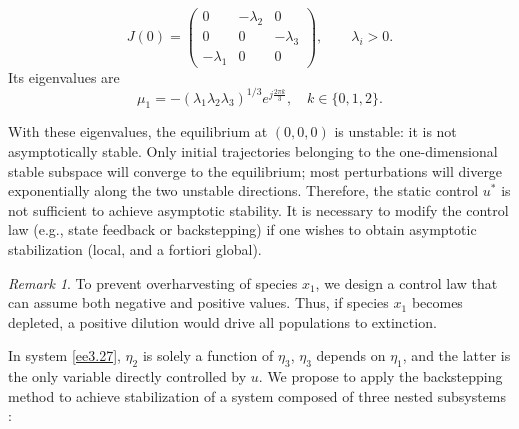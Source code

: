 \documentclass[10pt, a4paper]{amsart}
\newcounter{assu}
\theoremstyle{plain}
\theoremstyle{definition}
\theoremstyle{remark}
\newtheorem{remark}[lemma]{Remark}
\numberwithin{equation}{section}
\begin{document}
 $$
 J(0) =
 \begin{pmatrix}
 0 & -\lambda_2 & 0 \\[6pt]
 0 & 0 & -\lambda_3 \\[6pt]
 -\lambda_1 & 0 & 0
 \end{pmatrix},
 \qquad \lambda_i > 0.
 $$
Its eigenvalues are
$$\mu_1 = -(\lambda_1\lambda_2\lambda_3)^{1/3}e^{j\frac{2\pi k}{3}},\quad k\in \lbrace0,1,2\rbrace.$$

With these eigenvalues, the equilibrium at $(0,0,0)$ is unstable: it is not asymptotically stable. Only initial trajectories belonging to the one-dimensional stable subspace will converge to the equilibrium; most perturbations will diverge exponentially along the two unstable directions. Therefore, the static control $u^*$ is not sufficient to achieve asymptotic stability. It is necessary to modify the control law (e.g., state feedback or backstepping) if one wishes to obtain asymptotic stabilization (local, and a fortiori global).
\begin{remark}
To prevent overharvesting of species $x_1$, we design a control law that can assume both negative and positive values. Thus, if species $x_1$ becomes depleted, a positive dilution would drive all populations to extinction. 
\end{remark}

In system \eqref{ee3.27}, $\eta_{2}$ is solely a function of $\eta_{3}$, $\eta_{3}$ depends on $\eta_{1}$, and the latter is the only variable directly controlled by $u$. We propose to apply the backstepping method to achieve stabilization of a system composed of three nested subsystems : %

\end{document}
